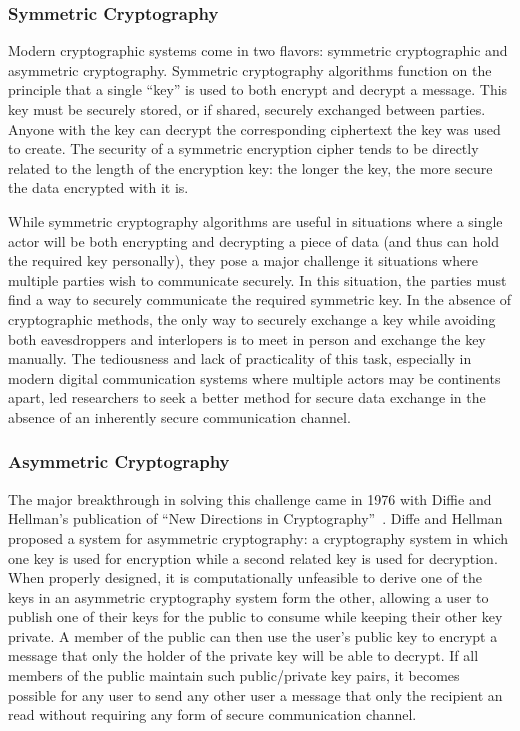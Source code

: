 \subsubsection{Symmetric Cryptography}

Modern cryptographic systems come in two flavors: symmetric
cryptographic and asymmetric cryptography. Symmetric cryptography
algorithms function on the principle that a single ``key'' is used to
both encrypt and decrypt a message. This key must be securely stored,
or if shared, securely exchanged between parties. Anyone with the key
can decrypt the corresponding ciphertext the key was used to
create. The security of a symmetric encryption cipher tends to be
directly related to the length of the encryption key: the longer the
key, the more secure the data encrypted with it is.

While symmetric cryptography algorithms are useful in situations where
a single actor will be both encrypting and decrypting a piece of data
(and thus can hold the required key personally), they pose a major
challenge it situations where multiple parties wish to communicate
securely. In this situation, the parties must find a way to securely
communicate the required symmetric key. In the absence of
cryptographic methods, the only way to securely exchange a key while
avoiding both eavesdroppers and interlopers is to meet in person and
exchange the key manually. The tediousness and lack of practicality of
this task, especially in modern digital communication systems where
multiple actors may be continents apart, led researchers to seek a
better method for secure data exchange in the absence of an inherently
secure communication channel.

\subsubsection{Asymmetric Cryptography}

The major breakthrough in solving this challenge came in 1976 with
Diffie and Hellman's publication of ``New Directions in
Cryptography''~\cite{Diffie1976}. Diffe and Hellman proposed a system
for asymmetric cryptography: a cryptography system in which one key is
used for encryption while a second related key is used for
decryption. When properly designed, it is computationally unfeasible
to derive one of the keys in an asymmetric cryptography system form
the other, allowing a user to publish one of their keys for the public
to consume while keeping their other key private. A member of the
public can then use the user's public key to encrypt a message that
only the holder of the private key will be able to decrypt. If all
members of the public maintain such public/private key pairs, it
becomes possible for any user to send any other user a message that
only the recipient an read without requiring any form of secure
communication channel.

